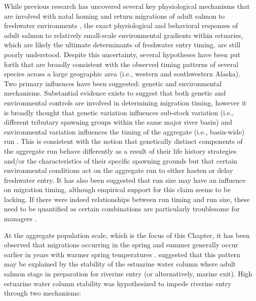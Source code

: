 \documentclass[12pt,]{book}
\theoremstyle{definition}
\theoremstyle{definition}
\theoremstyle{definition}
\theoremstyle{remark}
\begin{document}
While previous research has uncovered several key physiological
mechanisms that are involved with natal homing
\citep{hasler-scholz-1983} and return migrations of adult salmon to
freshwater environments
\citep{cooperman-etal-2010, cooke-etal-2008, hinch-etal-2012}, the exact
physiological and behavioral responses of adult salmon to relatively
small-scale environmental gradients within estuaries, which are likely
the ultimate determinants of freshwater entry timing, are still poorly
understood. Despite this uncertainty, several hypotheses have been put
forth that are broadly consistent with the observed timing patterns of
several species across a large geographic area (i.e., western and
southwestern Alaska). Two primary influences have been suggested:
genetic \citep{quinn-etal-2000, anderson-beer-2009, omalley-etal-2010}
and environmental \citep{hodgson-etal-2006, keefer-etal-2008}
mechanisms. Substantial evidence exists to suggest that both genetic and
environmental controls are involved in determining migration timing,
however it is broadly thought that genetic variation influences
sub-stock variation (i.e., different tributary spawning groups within
the same major river basin) and environmental variation influences the
timing of the aggregate (i.e., basin-wide) run
\citep{keefer-etal-2008, anderson-beer-2009}. This is consistent with
the notion that genetically distinct components of the aggregate run
behave differently as a result of their life history strategies and/or
the characteristics of their specific spawning grounds
\citetext{\citealp[e.g., sub-stocks that must travel farther in-river to
reach spawning grounds enter freshwater
earlier;][]{clark-etal-2015}; \citealp[sub-stocks that spawn in
tributaries influenced by warmer lakes enable later
spawning;][]{burger-etal-1985}} but that certain environmental
conditions act on the aggregate run to either hasten or delay freshwater
entry. It has also been suggested that run size may have an influence on
migration timing, although empirical support for this claim seems to be
lacking. If there were indeed relationships between run timing and run
size, these need to be quantified as certain combinations are
particularly troublesome for managers \citep[e.g., small/early runs and
large/late runs appear the same early
in-season;][]{adkison-cunningham-2015}.

At the aggregate population scale, which is the focus of this Chapter,
it has been observed that migrations occurring in the spring and summer
generally occur earlier in years with warmer spring temperatures
\citep{mundy-evenson-2011, hodgson-etal-2006}.
\citet{mundy-evenson-2011} suggested that this pattern may be explained
by the stability of the estuarine water column where adult salmon stage
in preparation for riverine entry (or alternatively, marine exit). High
estuarine water column stability was hypothesized to impede riverine
entry through two mechanisms:
\end{document}
